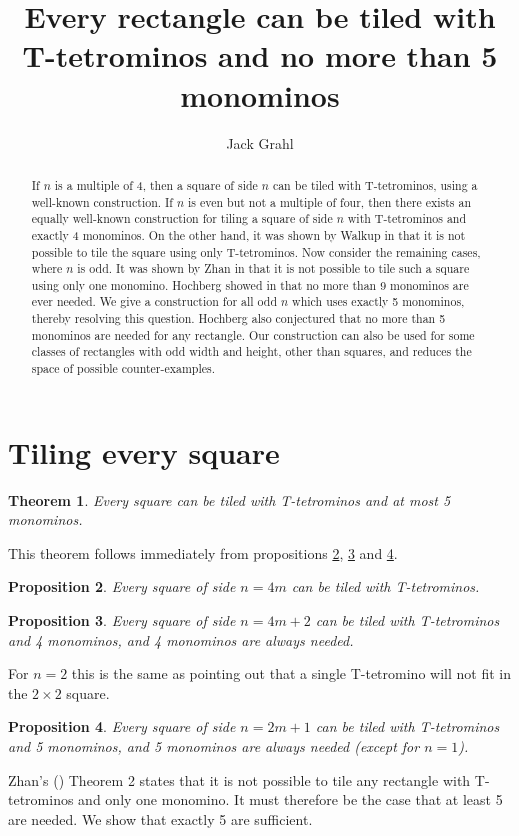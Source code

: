 \documentclass{article}
\title{Every rectangle can be tiled with T-tetrominos and no more than 5 monominos}
\author{Jack Grahl}
\theoremstyle{plain}
\newtheorem{theorem}{Theorem}[section]
\newtheorem{proposition}[theorem]{Proposition}
\begin{document}
\maketitle

\begin{abstract}
If $n$ is a multiple of 4, then a square of side $n$ can be tiled with T-tetrominos, using a well-known construction.
If $n$ is even but not a multiple of four, then there exists an equally well-known construction for tiling a square of side $n$ with T-tetrominos and exactly 4 monominos.
On the other hand, it was shown by Walkup in \cite{walkup} that it is not possible to tile the square using only T-tetrominos.
Now consider the remaining cases, where $n$ is odd.
It was shown by Zhan in \cite{zhan} that it is not possible to tile such a square using only one monomino.
Hochberg showed in \cite{hochberg} that no more than 9 monominos are ever needed.
We give a construction for all odd $n$ which uses exactly 5 monominos, thereby resolving this question.
Hochberg also conjectured that no more than 5 monominos are needed for any rectangle.
Our construction can also be used for some classes of rectangles with odd width and height, other than squares, and reduces the space of possible counter-examples.
\end{abstract}

\section{Tiling every square}
\begin{theorem}
Every square can be tiled with T-tetrominos and at most 5 monominos.
\end{theorem}
This theorem follows immediately from propositions \ref{four}, \ref{even} and \ref{odd}.

\begin{proposition}\label{four}
Every square of side $n = 4m$ can be tiled with T-tetrominos.
\end{proposition}
\begin{proposition}\label{even}
Every square of side $n = 4m + 2$ can be tiled with T-tetrominos and 4 monominos, and 4 monominos are always needed.
\end{proposition}
For $n = 2$ this is the same as pointing out that a single T-tetromino will not fit in the $2 \times 2$ square.

\begin{proposition}\label{odd}
Every square of side $n = 2m + 1$ can be tiled with T-tetrominos and 5 monominos, and 5 monominos are always needed (except for $n = 1$).
\end{proposition}
Zhan's (\cite{zhan}) Theorem 2 states that it is not possible to tile any rectangle with T-tetrominos and only one monomino. It must therefore be the case that at least 5 are needed. We show that exactly 5 are sufficient.
\end{document}
